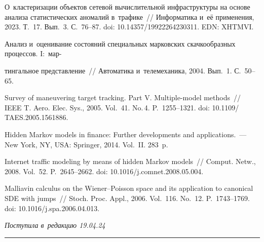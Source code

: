 \begin{multicols}{2}
{{\begin{thebibliography}{99}
 О~кластеризации объектов сетевой 
вычислительной инфраструктуры на основе анализа статистических аномалий в~трафике~// Информатика и~её применения, 2023. Т.~17. Вып.~3. С.~76--87. doi: 
10.14357/19922264230311. EDN: XHTMVI.


 Анализ и~оценивание состояний специальных марковских 
скачкообразных процессов. I:~мар-\linebreak\vspace*{-12pt}

\pagebreak

\noindent
тингальное представление~// Автоматика 
и~телемеханика, 2004. Вып.~1. С.~50--65. 

Survey of maneuvering target tracking. Part V. Multiple-model methods~//
IEEE T. Aero.  Elec. Sys., 2005. Vol.~41. No.\,4. 
P.~1255--1321. doi: 10.1109/ TAES.2005.1561886.

Hidden Markov models in finance: Further developments and
applications.~--- New York, NY, USA: Springer, 2014.  Vol.~II. 283~p.

Internet traffic modeling by means of hidden Markov models~//
Comput. Netw., 2008. Vol.~52. P.~2645--2662. doi: 10.1016/j.comnet.2008.05.004.

  Malliavin calculus on the Wiener--Poisson space and 
its application to canonical SDE with jumps~// Stoch. Proc. Appl., 2006. Vol.~116. No.~12. P.~1743--1769. doi: 10.1016/j.spa.2006.04.013.

\end{thebibliography}

 }
 }

\end{multicols}

\vspace*{-6pt}

\hfill{\small\textit{Поступила в~редакцию 19.04.24}}

\vspace*{10pt}




\hrule

